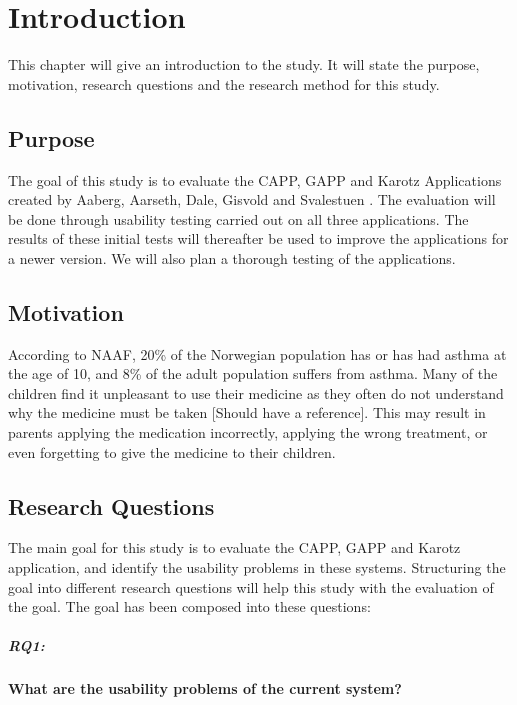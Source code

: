 \chapter{Introduction}
\label{chp:introduction}

This chapter will give an introduction to the study. It will state the purpose, motivation, research questions and the research method for this study. 

\section{Purpose}
\label{sec:purpose}
The goal of this study is to evaluate the CAPP, GAPP and Karotz Applications created by Aaberg, Aarseth, Dale, Gisvold and Svalestuen \cite{CustomerDriven}.
The evaluation will be done through usability testing carried out on all three applications. The results of these initial tests will thereafter be used to improve the applications for a newer version. 
We will also plan a thorough testing of the applications.


\section{Motivation}
\label{sec:motivation}
According to NAAF, 20\% \cite{NAAF} of the Norwegian population has or has had asthma at the age of 10, and 8\% of the adult population suffers from asthma. Many of the children find it unpleasant to use their medicine as they often do not understand why the medicine must be taken [Should have a reference]. This may result in parents applying the medication incorrectly, applying the wrong treatment, or even forgetting to give the medicine to their children. 


\section{Research Questions}
\label{sec:researchquestions}
The main goal for this study is to evaluate the CAPP, GAPP and Karotz application, and identify the usability problems in these systems. Structuring the goal into different research questions will help this study with the evaluation of the goal. The goal has been composed into these questions:

\paragraph{RQ1:}
\textbf{What are the usability problems of the current system?}


